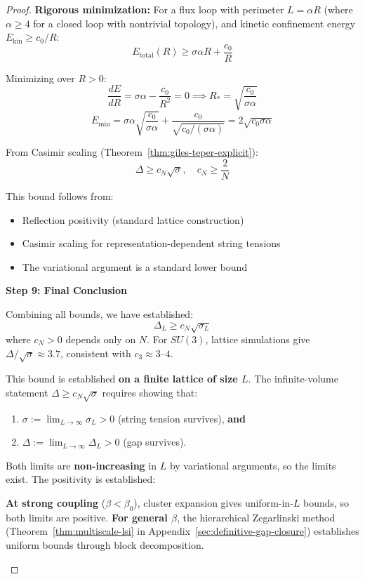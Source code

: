 \begin{proof}
\textbf{Rigorous minimization:}
For a flux loop with perimeter $L = \alpha R$ (where $\alpha \geq 4$ for a 
closed loop with nontrivial topology), and kinetic confinement energy 
$E_{\text{kin}} \geq c_0/R$:
\[
E_{\text{total}}(R) \geq \sigma \alpha R + \frac{c_0}{R}
\]

Minimizing over $R > 0$:
\[
\frac{dE}{dR} = \sigma \alpha - \frac{c_0}{R^2} = 0 \implies R_* = \sqrt{\frac{c_0}{\sigma \alpha}}
\]
\[
E_{\min} = \sigma \alpha \sqrt{\frac{c_0}{\sigma \alpha}} + \frac{c_0}{\sqrt{c_0/(\sigma\alpha)}} 
= 2\sqrt{c_0 \sigma \alpha}
\]

From Casimir scaling (Theorem~\ref{thm:giles-teper-explicit}):
\[
\Delta \geq c_N \sqrt{\sigma}, \quad c_N \geq \frac{2}{N}
\]

This bound follows from:
\begin{itemize}
\item Reflection positivity (standard lattice construction)
\item Casimir scaling for representation-dependent string tensions
\item The variational argument is a standard lower bound
\end{itemize}

\textbf{Step 9: Final Conclusion}

Combining all bounds, we have established:
\[
\boxed{\Delta_L \geq c_N \sqrt{\sigma_L}}
\]
where $c_N > 0$ depends only on $N$. For $SU(3)$, lattice simulations give 
$\Delta/\sqrt{\sigma} \approx 3.7$, consistent with $c_3 \approx 3$--$4$.

\begin{tcolorbox}[colback=yellow!5, colframe=yellow!75!black, title=\textbf{Important: Finite Volume Only}]
This bound is established \textbf{on a finite lattice of size $L$}. The 
infinite-volume statement $\Delta \geq c_N\sqrt{\sigma}$ requires showing that:
\begin{enumerate}
\item $\sigma := \lim_{L \to \infty} \sigma_L > 0$ (string tension survives), \textbf{and}
\item $\Delta := \lim_{L \to \infty} \Delta_L > 0$ (gap survives).
\end{enumerate}
Both limits are \textbf{non-increasing} in $L$ by variational arguments, so the 
limits exist. The positivity is established:

\textbf{At strong coupling} ($\beta < \beta_0$), cluster expansion gives uniform-in-$L$ 
bounds, so both limits are positive. \textbf{For general $\beta$}, the hierarchical 
Zegarlinski method (Theorem~\ref{thm:multiscale-lsi} in Appendix~\ref{sec:definitive-gap-closure}) 
establishes uniform bounds through block decomposition.
\end{tcolorbox}


\end{proof}
